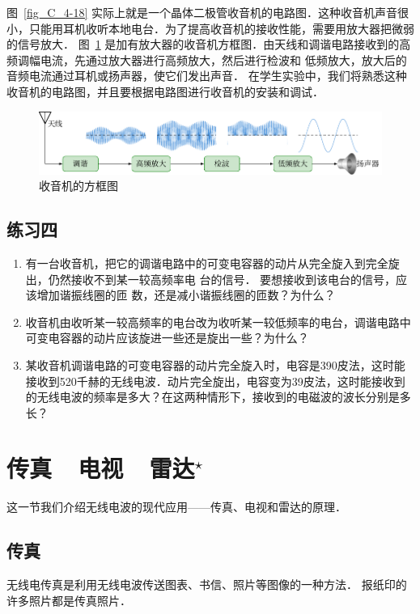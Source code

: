 图~\ref{fig_C_4-18} 实际上就是一个晶体二极管收音机的电路图．这种收音机声音很小，只能用耳机收听本地电台．为了提高收音机的接收性能，需要用放大器把微弱的信号放大．
图~\ref{fig_C_4-20} 是加有放大器的收音机方框图．由天线和调谐电路接收到的高频调幅电流，先通过放大器进行高频放大，然后进行检波和
低频放大，放大后的音频电流通过耳机或扬声器，使它们发出声音．
在学生实验中，我们将熟悉这种收音机的电路图，并且要根据电路图进行收音机的安装和调试．
\begin{figure}[htbp]
    \centering
    \includegraphics{fig/C/4-20.pdf}
    \caption{收音机的方框图}\label{fig_C_4-20}
\end{figure}


\subsection*{练习四}
\begin{enumerate}
    \item 有一台收音机，把它的调谐电路中的可变电容器的动片从完全旋入到完全旋出，仍然接收不到某一较高频率电
    台的信号．
    要想接收到该电台的信号，应该增加谐振线圈的匝
    数，还是减小谐振线圈的匝数？为什么？
    \item 收音机由收听某一较高频率的电台改为收听某一较低频率的电台，调谐电路中可变电容器的动片应该旋进一些还是旋出一些？为什么？
    \item 某收音机调谐电路的可变电容器的动片完全旋入时，电容是390皮法，这时能接收到520千赫的无线电波．动片完全旋出，电容变为39皮法，这时能接收到的无线电波的频率是多大？在这两种情形下，接收到的电磁波的波长分别是多长？
\end{enumerate}

\section{传真~~电视~~雷达$^\star$}
这一节我们介绍无线电波的现代应用——传真、电视和雷达的原理．

\subsection{传真}

无线电传真是利用无线电波传送图表、书信、照片等图像的一种方法．
报纸印的许多照片都是传真照片．

